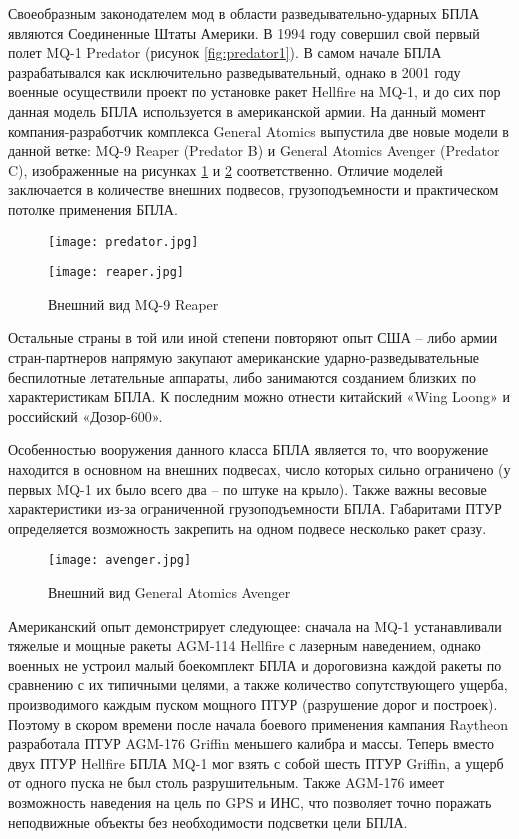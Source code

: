 Своеобразным законодателем мод в области разведывательно-ударных БПЛА являются Соединенные Штаты Америки. В 1994 году совершил свой первый полет MQ-1 Predator (рисунок \ref{fig:predator1}). В самом начале БПЛА разрабатывался как исключительно разведывательный, однако в 2001 году военные осуществили проект по установке ракет Hellfire на MQ-1, и до сих пор данная модель БПЛА используется в американской армии. На данный момент компания-разработчик комплекса General Atomics выпустила две новые модели в данной ветке: MQ-9 Reaper (Predator B) и General Atomics Avenger (Predator C), изображенные на рисунках \ref{fig:reaper1} и \ref{fig:avenger1} соответственно. Отличие моделей заключается в количестве внешних подвесов, грузоподъемности и практическом потолке применения БПЛА.

\begin{figure}[h]
\begin{center}
	\begin{minipage}[h]{0.4\linewidth}
		\texttt{[image: predator.jpg]}
		\caption{Внешний вид MQ-1 Predateor}
		\label{fig:predator1}
	\end{minipage}
	\begin{minipage}[h]{0.4\linewidth}
		\texttt{[image: reaper.jpg]}
		\caption{Внешний вид MQ-9 Reaper}
		\label{fig:reaper1}
	\end{minipage}
\end{center}
\end{figure}

Остальные страны в той или иной степени повторяют опыт США – либо армии стран-партнеров напрямую закупают американские ударно-разведывательные беспилотные летательные аппараты, либо занимаются созданием близких по характеристикам БПЛА. К последним можно отнести китайский «Wing Loong» и российский «Дозор-600».

Особенностью вооружения данного класса БПЛА является то, что вооружение находится в основном на внешних подвесах, число которых сильно ограничено (у первых MQ-1 их было всего два – по штуке на крыло). Также важны весовые характеристики из-за ограниченной грузоподъемности БПЛА. Габаритами ПТУР определяется возможность закрепить на одном подвесе несколько ракет сразу.
\begin{figure}[h]
	\texttt{[image: avenger.jpg]}
	\caption{Внешний вид General Atomics Avenger}
	\label{fig:avenger1}
\end{figure}

Американский опыт демонстрирует следующее: сначала на MQ-1 устанавливали тяжелые и мощные ракеты AGM-114 Hellfire с лазерным наведением, однако военных не устроил малый боекомплект БПЛА и дороговизна каждой ракеты по сравнению с их типичными целями, а также количество сопутствующего ущерба, производимого каждым пуском мощного ПТУР (разрушение дорог и построек). Поэтому в скором времени после начала боевого применения кампания Raytheon разработала ПТУР AGM-176 Griffin меньшего калибра и массы. Теперь вместо двух ПТУР Hellfire БПЛА MQ-1 мог взять с собой шесть ПТУР Griffin, а ущерб от одного пуска не был столь разрушительным. Также AGM-176 имеет возможность наведения на цель по GPS и ИНС, что позволяет точно поражать неподвижные объекты без необходимости подсветки цели БПЛА.

